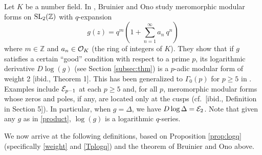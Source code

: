 \documentclass{gtpart}
\theoremstyle{definition}
\theoremstyle{remark}
\newcommand{\mb}[1]{\mathbb{#1}}
\newcommand{\CE}{{\cal E}}
\newcommand{\CO}{{\cal O}}
\newcommand{\BZ}{{\mb Z}}
\renewcommand{\D}{\Delta}
\newcommand{\G}{\Gamma}
\renewcommand{\=}{\approx}
\renewcommand{\-}{\sim}
\newcommand{\SL}{{\rm SL}}
\numberwithin{equation}{section}
\numberwithin{thm}{section}
\begin{document}
Let $K$ be a number field.  
In \cite{BruinierOno}, Bruinier and Ono study meromorphic modular forms on $\SL_2(\BZ)$ with $q$-expansion 
\begin{equation}
 \label{product}
 g(z) = q^m \left( 1 + \sum_{n=1}^\infty a_n ~\! q^n \right) 
\end{equation}
where $m \in \BZ$ and $a_n \in \CO_K$ (the ring of integers of $K$).  
They show that if $g$ satisfies a certain ``good'' condition with respect to a prime $p$, 
its logarithmic derivative $D \log(g)$ (see Section \ref{subsec:thm}) 
is a $p$-adic modular form of weight 2 [ibid., Theorem 1].  
This has been generalized to $\G_0(p)$ for $p \geq 5$ in \cite[Theorem 4]{Getz}.  
Examples include $\CE_{p - 1}$ at each $p \geq 5$ and, for all $p$, 
meromorphic modular forms whose zeros and poles, if any, are located only at the cusps (cf.~[ibid., Definition in Section 5]).  
In particular, when $g = \D$, we have $D \log \D = \CE_2$.  
Note that given any $g$ as in \eqref{product}, $\log(g)$ is a logarithmic $q$-series.  

We now arrive at the following definitions, 
based on Proposition \ref{prop:logq} (specifically \eqref{weight} and \eqref{Tplogq}) 
and the theorem of Bruinier and Ono above.  
\end{document}
